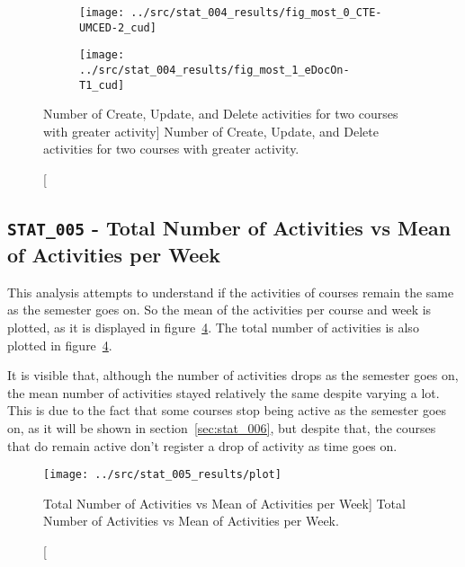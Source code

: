 \begin{figure}[h!]
    \centering

    \begin{subfigure}{.5\textwidth}
        \centering
        \texttt{[image: ../src/stat\_004\_results/fig\_most\_0\_CTE-UMCED-2\_cud]}
        \label{subfig:stat_004_0_cud}
    \end{subfigure}%
    \begin{subfigure}{.5\textwidth}
        \centering
        \texttt{[image: ../src/stat\_004\_results/fig\_most\_1\_eDocOn-T1\_cud]}
        \label{subfig:stat_004_3_cud}
    \end{subfigure}

    \caption
        [Number of Create, Update, and Delete activities for two courses with
        greater activity]
        {Number of Create, Update, and Delete activities for two courses with
        greater activity.}

    \label{fig:stat_004_cud}
\end{figure}

\subsection{\texttt{STAT\_005} - Total Number of Activities vs Mean of
Activities per Week}

This analysis attempts to understand if the activities of courses remain the
same as the semester goes on. So the mean of the activities per course and week
is plotted, as it is displayed in figure~\ref{fig:stat_005}. The total number
of activities is also plotted in figure~\ref{fig:stat_005}.

It is visible that, although the number of activities drops as the semester
goes on, the mean number of activities stayed relatively the same despite
varying a lot. This is due to the fact that some courses stop being active as
the semester goes on, as it will be shown in section~\ref{sec:stat_006}, but
despite that, the courses that do remain active don't register a drop of
activity as time goes on.

\begin{figure}[h!]
    \centering

    \texttt{[image: ../src/stat\_005\_results/plot]}

    \caption
        [Total Number of Activities vs Mean of Activities per Week]
        {Total Number of Activities vs Mean of Activities per Week.}

    \label{fig:stat_005}
\end{figure}

